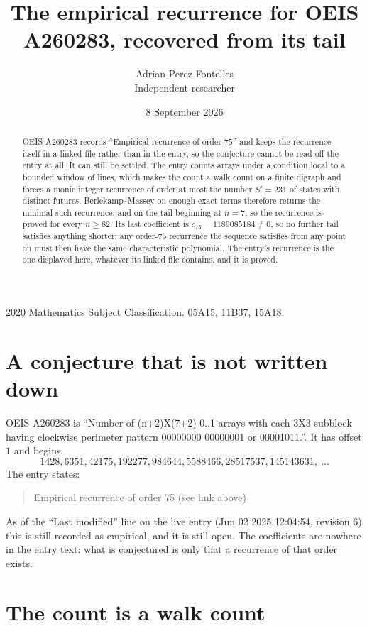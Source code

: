 \documentclass[11pt,a4paper]{article}
\title{The empirical recurrence for OEIS A260283, recovered from its tail}
\author{Adrian Perez Fontelles\\ \small Independent researcher}
\date{8 September 2026}
\theoremstyle{plain}
\theoremstyle{definition}
\begin{document}
\maketitle

\begin{abstract}
OEIS A260283 records ``Empirical recurrence of order $75$'' and keeps the recurrence itself in
a linked file rather than in the entry, so the conjecture cannot be read off the entry at all.
It can still be settled. The entry counts arrays under a condition local to a bounded window of
lines, which makes the count a walk count on a finite digraph and forces a monic integer
recurrence of order at most the number $S'=231$ of states with distinct futures. Berlekamp--Massey on
enough exact terms therefore returns the minimal such recurrence, and on the tail beginning at $n=7$, so the recurrence is proved for every $n\ge82$.
Its last coefficient is $c_{75}=1189085184\neq0$, so no further tail satisfies anything
shorter; any order-$75$ recurrence the sequence satisfies from any point on must then have
the same characteristic polynomial. The entry's recurrence is the one displayed here, whatever
its linked file contains, and it is proved.
\end{abstract}

\noindent\small 2020 Mathematics Subject Classification. 05A15, 11B37, 15A18.\normalsize

\section{A conjecture that is not written down}

OEIS A260283 is ``Number of (n+2)X(7+2) 0..1 arrays with each 3X3 subblock having clockwise perimeter pattern 00000000 00000001 or 00001011.''. It has offset $1$ and begins
\[
1428, 6351, 42175, 192277, 984644, 5588466, 28517537, 145143631,\ \dots
\]
The entry states:
\begin{quote}
Empirical recurrence of order 75 (see link above)
\end{quote}
As of the ``Last modified'' line on the live entry (Jun 02 2025 12:04:54, revision 6)
this is still recorded as empirical, and it is still open. The coefficients are nowhere in the
entry text: what is conjectured is only that a recurrence of that order exists.

\section{The count is a walk count}
\end{document}
